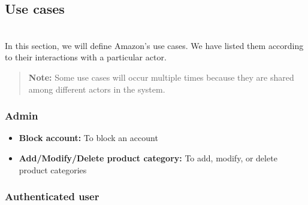 \subsection{Use cases}\label{JENTUp4f__AwUMTq93mlD}
\\
In this section, we will define Amazon's use cases. We have listed them according to their interactions with a particular actor.
\begin{quote}
\textbf{Note:} Some use cases will occur multiple times because they are shared among different actors in the system.
\end{quote}
\subsubsection{Admin}\label{MTFbLqYXRYkWo9NdLuBEY}

\begin{itemize}
\item
\protect{}\label{EjWzSE1WojMcff7g5MUok}
\textbf{Block account:} To block an account
\item
\protect{}\label{olTwJlpE_rBaVsH2S8f46}
\textbf{Add/Modify/Delete product category:} To add, modify, or delete product categories
\end{itemize}

\subsubsection{Authenticated user}\label{3S-oTc7rysiRAgvBPfG1V}


